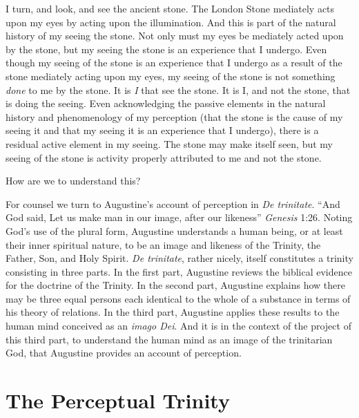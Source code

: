 \documentclass[12pt]{article}
\begin{document}
I turn, and look, and see the ancient stone. The London Stone mediately acts upon my eyes by acting upon the illumination. And this is part of the natural history of my seeing the stone. Not only must my eyes be mediately acted upon by the stone, but my seeing the stone is an experience that I undergo. Even though my seeing of the stone is an experience that I undergo as a result of the stone mediately acting upon my eyes, my seeing of the stone is not something \emph{done} to me by the stone. It is \emph{I} that see the stone. It is I, and not the stone, that is doing the seeing. Even acknowledging the passive elements in the natural history and phenomenology of my perception (that the stone is the cause of my seeing it and that my seeing it is an experience that I undergo), there is a residual active element in my seeing. The stone may make itself seen, but my seeing of the stone is activity properly attributed to me and not the stone.

How are we to understand this?

For counsel we turn to Augustine's account of perception in \emph{De trinitate}. ``And God said, Let us make man in our image, after our likeness'' \emph{Genesis} 1:26. Noting God's use of the plural form, Augustine understands a human being, or at least their inner spiritual nature, to be an image and likeness of the Trinity, the Father, Son, and Holy Spirit. \emph{De trinitate}, rather nicely, itself constitutes a trinity consisting in three parts. In the first part, Augustine reviews the biblical evidence for the doctrine of the Trinity. In the second part, Augustine explains how there may be three equal persons each identical to the whole of a substance in terms of his theory of relations. In the third part, Augustine applies these results to the human mind conceived as an \emph{imago Dei}. And it is in the context of the project of this third part, to understand the human mind as an image of the trinitarian God, that Augustine provides an account of perception.


\section{The Perceptual Trinity} %
\label{sec:the_perceptual_trinity}
\end{document}

